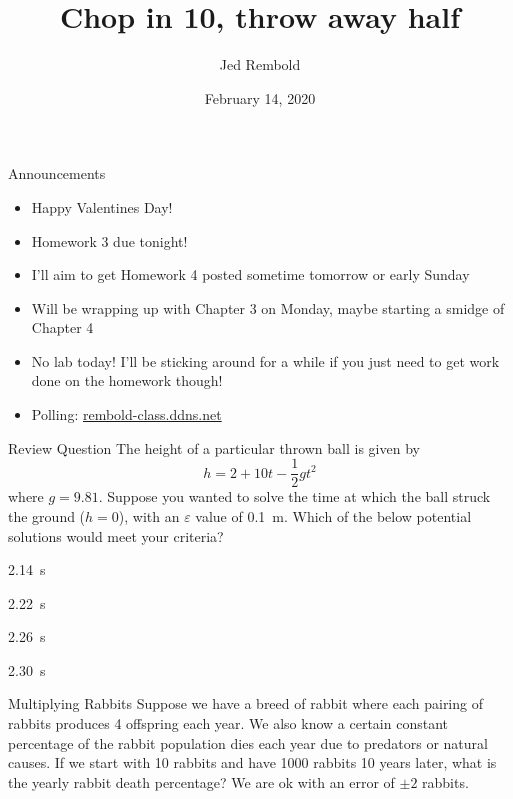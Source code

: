 \documentclass[pdf, aspectratio=169, 12pt]{beamer}
\title{Chop in 10, throw away half}
\author{Jed Rembold}
\date{February 14, 2020}
\begin{document}
\begin{frame}{Announcements}
	\begin{itemize}
		\item Happy Valentines Day!
		\item Homework 3 due tonight!
		\item I'll aim to get Homework 4 posted sometime tomorrow or early Sunday
		\item Will be wrapping up with Chapter 3 on Monday, maybe starting a smidge of Chapter 4
		\item No lab today! I'll be sticking around for a while if you just need to get work done on the homework though!
		\item Polling: \url{rembold-class.ddns.net}
	\end{itemize}
\end{frame}

\begin{frame}{Review Question}
	The height of a particular thrown ball is given by
	\[h = 2 + 10t - \frac{1}{2}gt^2\]
	where $g=9.81$. Suppose you wanted to solve the time at which the ball struck the ground ($h=0$), with an $\varepsilon$ value of \SI{0.1}{\meter}. Which of the below potential solutions would meet your criteria?
	\begin{poll}
	\item \SI{2.14}{\s}
	\item \SI{2.22}{\s}
	\item \SI{2.26}{\s}
	\item \SI{2.30}{\s}
	\end{poll}
\end{frame}



\begin{frame}{Multiplying Rabbits}
	Suppose we have a breed of rabbit where each pairing of rabbits produces 4 offspring each year. We also know a certain constant percentage of the rabbit population dies each year due to predators or natural causes. If we start with 10 rabbits and have 1000 rabbits 10 years later, what is the yearly rabbit death percentage? We are ok with an error of $\pm 2$ rabbits.
\end{frame}
\end{document}

